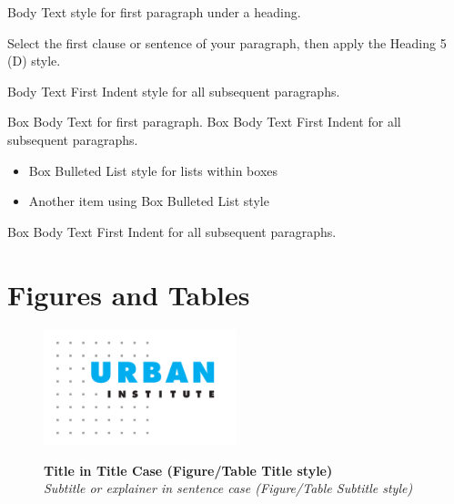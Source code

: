 Body Text style for first paragraph under a heading.

 Select the first clause or sentence of your paragraph, then apply the Heading 5 (D) style. 

\prequotebar


\postquotebar

Body Text First Indent style for all subsequent paragraphs.


\preboxbar



Box Body Text for first paragraph.
Box Body Text First Indent for all subsequent paragraphs.
\begin{itemize}
    \item Box Bulleted List style for lists within boxes
    \item Another item using Box Bulleted List style
\end{itemize}
\indent Box Body Text First Indent for all subsequent paragraphs.



\postboxbar

\newpage
\part{Figures and Tables}

\begin{figure}[htbp]
    \caption{
    \textbf{Title in Title Case (Figure/Table Title style)}\\
    \textit{Subtitle or explainer in sentence case (Figure/Table Subtitle style)}
    }
    \centering
    \includegraphics[width=0.5\textwidth]{images/logo.png}
    \label{fig:my_label}
\end{figure}
\begin{singlespace}
    \\
\end{singlespace}

